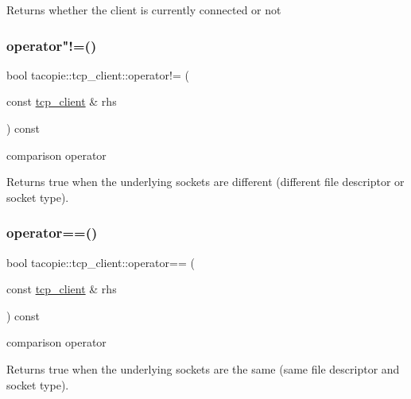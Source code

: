 \begin{DoxyReturn}{Returns}
whether the client is currently connected or not 
\end{DoxyReturn}
\mbox{\label{classtacopie_1_1tcp__client_af352b6b1e939c919aec2761517051eb9}} 
\subsubsection{\texorpdfstring{operator"!=()}{operator!=()}}
{\footnotesize\ttfamily bool tacopie\+::tcp\+\_\+client\+::operator!= (\begin{DoxyParamCaption}\item[{const \hyperlink{classtacopie_1_1tcp__client}{tcp\+\_\+client} \&}]{rhs }\end{DoxyParamCaption}) const}

comparison operator

\begin{DoxyReturn}{Returns}
true when the underlying sockets are different (different file descriptor or socket type). 
\end{DoxyReturn}
\mbox{\label{classtacopie_1_1tcp__client_af7a1796c04efd00542349ecab692e073}} 
\subsubsection{\texorpdfstring{operator==()}{operator==()}}
{\footnotesize\ttfamily bool tacopie\+::tcp\+\_\+client\+::operator== (\begin{DoxyParamCaption}\item[{const \hyperlink{classtacopie_1_1tcp__client}{tcp\+\_\+client} \&}]{rhs }\end{DoxyParamCaption}) const}

comparison operator

\begin{DoxyReturn}{Returns}
true when the underlying sockets are the same (same file descriptor and socket type). 
\end{DoxyReturn}
\mbox{\label{classtacopie_1_1tcp__client_a8c290d681186edb0578051c04f3c0762}} 
